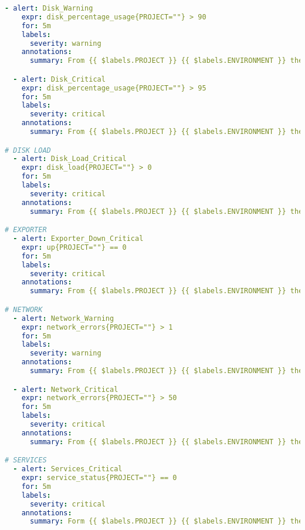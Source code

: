 \begin{lstlisting}[language=yaml,caption={Fichero estándar de configuración de alertas en Prometheus}, label={lst:standar.yml}]
  - alert: Disk_Warning
    expr: disk_percentage_usage{PROJECT=""} > 90
    for: 5m
    labels:
      severity: warning
    annotations:
      summary: From {{ $labels.PROJECT }} {{ $labels.ENVIRONMENT }} the host {{ $labels.HOST }} has {{humanize $value}}% in volume {{ $labels.volume }} [warning usage].

  - alert: Disk_Critical
    expr: disk_percentage_usage{PROJECT=""} > 95
    for: 5m
    labels:
      severity: critical
    annotations:
      summary: From {{ $labels.PROJECT }} {{ $labels.ENVIRONMENT }} the host {{ $labels.HOST }} has {{humanize $value}}% in volume {{ $labels.volume }} [critical usage].

# DISK LOAD
  - alert: Disk_Load_Critical
    expr: disk_load{PROJECT=""} > 0
    for: 5m
    labels:
      severity: critical
    annotations:
      summary: From {{ $labels.PROJECT }} {{ $labels.ENVIRONMENT }} the host {{ $labels.HOST }} has excessive disk load (read/write).

# EXPORTER
  - alert: Exporter_Down_Critical
    expr: up{PROJECT=""} == 0
    for: 5m
    labels:
      severity: critical
    annotations:
      summary: From {{ $labels.PROJECT }} {{ $labels.ENVIRONMENT }} the host {{ $labels.HOST }} has the {{ $labels.EXPORTER }} is down.

# NETWORK
  - alert: Network_Warning
    expr: network_errors{PROJECT=""} > 1
    for: 5m
    labels:
      severity: warning
    annotations:
      summary: From {{ $labels.PROJECT }} {{ $labels.ENVIRONMENT }} the host {{ $labels.HOST }} has warning network problems.

  - alert: Network_Critical
    expr: network_errors{PROJECT=""} > 50
    for: 5m
    labels:
      severity: critical
    annotations:
      summary: From {{ $labels.PROJECT }} {{ $labels.ENVIRONMENT }} the host {{ $labels.HOST }} has critical network problems.

# SERVICES
  - alert: Services_Critical
    expr: service_status{PROJECT=""} == 0
    for: 5m
    labels:
      severity: critical
    annotations:
      summary: Form {{ $labels.PROJECT }} {{ $labels.ENVIRONMENT }} the host {{ $labels.HOST }} has the service {{ $labels.name }} down.
\end{lstlisting}